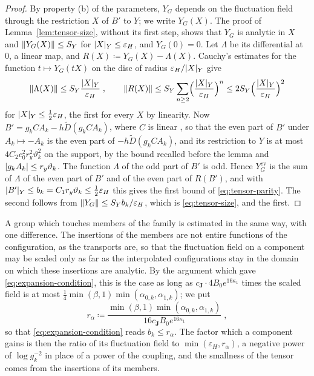 \documentclass[11pt]{preprint}
\DeclarePairedDelimiter{\abs}{\lvert}{\rvert}
\DeclarePairedDelimiter{\norm}{\lVert}{\rVert}
\numberwithin{equation}{section}
\theoremstyle{definition}
\theoremstyle{remark}
\theoremstyle{plain}
\begin{document}
\begin{proof}
By property (b) of the parameters, $Y_G$ depends on the fluctuation field through the restriction $X$ of $B'$ to $Y$; we write $Y_G(X)$. The proof of Lemma~\ref{lem:tensor-size}, without its first step, shows that $Y_G$ is analytic in $X$ and $\norm{Y_G(X)} \leq S_Y$ for $\abs X_Y \leq \varepsilon_H$, and $Y_G(0) = 0$. Let $\Lambda$ be its differential at $0$, a linear map, and $R(X) \coloneqq Y_G(X) - \Lambda(X)$. Cauchy's estimates for the function $t \mapsto Y_G(tX)$ on the disc of radius $\varepsilon_H/\abs X_Y$ give
\[
    \norm{\Lambda(X)} \leq S_Y\frac{\abs X_Y}{\varepsilon_H}\;,
    \qquad
    \norm{R(X)} \leq S_Y\sum_{n \geq 2}\Bigl(\frac{\abs X_Y}{\varepsilon_H}\Bigr)^n \leq 2S_Y\Bigl(\frac{\abs X_Y}{\varepsilon_H}\Bigr)^2
\]
for $\abs X_Y \leq \frac12\varepsilon_H$, the first for every $X$ by linearity. Now $B' = g_kCA_k - h\tilde D(g_kCA_k)$, where $C$ is linear \cite[p.~268]{BalabanRG1}, so that the even part of $B'$ under $A_k \mapsto -A_k$ is the even part of $-h\tilde D(g_kCA_k)$, and its restriction to $Y$ is at most $4C_2c_0^2r_y^2\vartheta_k^2$ on the support, by the bound recalled before the lemma and $\abs{g_kA_k} \leq r_y\vartheta_k$. The function $\Lambda$ of the odd part of $B'$ is odd. Hence $Y^{\mathrm{ev}}_G$ is the sum of $\Lambda$ of the even part of $B'$ and of the even part of $R(B')$, and with $\abs{B'}_Y \leq b_k = C_1r_y\vartheta_k \leq \frac12\varepsilon_H$ this gives the first bound of \eqref{eq:tensor-parity}. The second follows from $\norm{Y_G} \leq S_Yb_k/\varepsilon_H$, which is \eqref{eq:tensor-size}, and the first.
\end{proof}

A group which touches members of the family is estimated in the same way, with one difference. The insertions of the members are not entire functions of the configuration, as the transports are, so that the fluctuation field on a component may be scaled only as far as the interpolated configurations stay in the domain on which these insertions are analytic. By the argument which gave \eqref{eq:expansion-condition}, this is the case as long as $c_{\mathbf J} \cdot 4B_0e^{16\kappa_1}$ times the scaled field is at most $\frac14\min(\beta, 1)\min(\alpha_{0,k}, \alpha_{1,k})$; we put
\begin{equation}\label{eq:member-radius}
    r_\alpha \coloneqq \frac{\min(\beta, 1)\min(\alpha_{0,k}, \alpha_{1,k})}{16c_{\mathbf J}B_0e^{16\kappa_1}}\;,
\end{equation}
so that \eqref{eq:expansion-condition} reads $b_k \leq r_\alpha$. The factor which a component gains is then the ratio of its fluctuation field to $\min(\varepsilon_H, r_\alpha)$, a negative power of $\log g_k^{-2}$ in place of a power of the coupling, and the smallness of the tensor comes from the insertions of its members.
\end{document}
